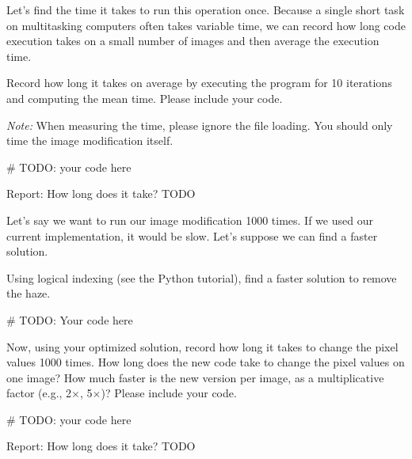 \documentclass{csci1430}
\begin{document}
\pagebreak
Let's find the time it takes to run this operation once. Because a single short task on multitasking computers often takes variable time, we can record how long code execution takes on a small number of images and then average the execution time.

\begin{subsubquestion}[points=1]
Record how long it takes on average by executing the program for 10 iterations and computing the mean time. Please include your code.
\end{subsubquestion}

\emph{Note: } When measuring the time, please ignore the file loading. You should only time the image modification itself.

\begin{answer}[height=30]
\begin{python}
# TODO: your code here
\end{python}

Report: How long does it take? TODO
\end{answer}

\pagebreak
\begin{subquestion}[points=3,drawbox=false]
Let's say we want to run our image modification 1000 times. If we used our current implementation, it would be slow. Let's suppose we can find a faster solution.
\end{subquestion}

\begin{subsubquestion}[points=2]
Using logical indexing (see the Python tutorial), find a faster solution to remove the haze. 
\end{subsubquestion}

\begin{answer}[height=25]
\begin{python}
# TODO: Your code here
\end{python}
\end{answer}


\pagebreak
\begin{subsubquestion}[points=1]
Now, using your optimized solution, record how long it takes to change the pixel values 1000 times. How long does the new code take to change the pixel values on one image? How much faster is the new version per image, as a
multiplicative factor (e.g., 2$\times$, 5$\times$)? Please include your code.
\end{subsubquestion}

\begin{answer}[height=30]
\begin{python}
# TODO: your code here
\end{python}

Report: How long does it take? TODO 

\end{answer}
\end{document}
